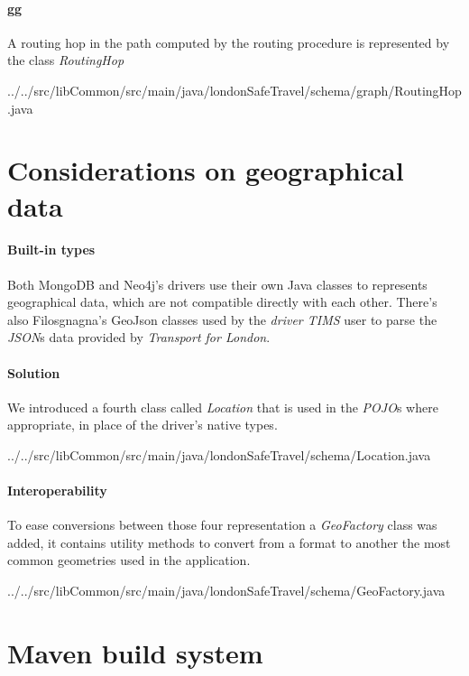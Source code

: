 \paragraph{gg}
A routing hop in the path computed by the routing procedure is represented by 
the class \textit{RoutingHop}


{../../src/libCommon/src/main/java/londonSafeTravel/schema/graph/RoutingHop.java}

\section{Considerations on geographical data}

\paragraph{Built-in types} %
Both MongoDB and Neo4j's drivers use their own Java classes to represents 
geographical data, which are not compatible directly with each other. There's 
also Filosgnagna's GeoJson classes used by the \textit{driver TIMS} user to 
parse the \textit{JSON}s data provided by \textit{Transport for London}.

\paragraph{Solution}
We introduced a fourth class called \textit{Location} that is used in the 
\textit{POJO}s where appropriate, in place of the driver's native types.


{../../src/libCommon/src/main/java/londonSafeTravel/schema/Location.java}

\paragraph{Interoperability}
To ease conversions between those four representation a \textit{GeoFactory} 
class was added, it contains utility methods to convert from a format to 
another the most common geometries used in the application.


{../../src/libCommon/src/main/java/londonSafeTravel/schema/GeoFactory.java}

\section{Maven build system}

